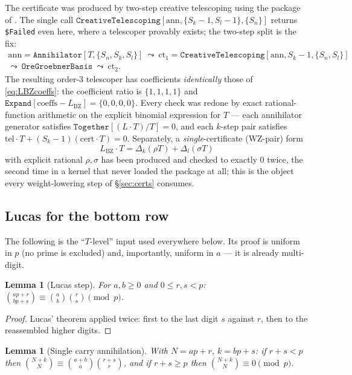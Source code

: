 \documentclass[11pt,reqno]{amsart}
\theoremstyle{plain}
\newtheorem{lemma}[theorem]{Lemma}
\theoremstyle{definition}
\theoremstyle{remark}
\numberwithin{equation}{section}
\newcommand{\LBZ}{L_{\mathrm{BZ}}}
\begin{document}
The certificate was produced by two-step creative telescoping \cite{Zei91,WZ92} using the
package of \cite{Ko10}. The single call
$\mathtt{CreativeTelescoping}[\mathrm{ann},\{S_k{-}1,S_l{-}1\},\{S_n\}]$ returns
\texttt{\$Failed} even here, where a telescoper provably exists; the two-step split is the fix:
\[
\begin{gathered}
\mathrm{ann}=\mathtt{Annihilator}[T,\{S_n,S_k,S_l\}]\ \leadsto\
\mathrm{ct}_1=\mathtt{CreativeTelescoping}[\mathrm{ann},S_k-1,\{S_n,S_l\}]\\
\leadsto\ \mathtt{OreGroebnerBasis}\ \leadsto\ \mathrm{ct}_2 .
\end{gathered}
\]
The resulting order-$3$ telescoper has coefficients \emph{identically} those of
\eqref{eq:LBZcoeffs}: the coefficient ratio is $\{1,1,1,1\}$ and
$\mathtt{Expand}[\text{coeffs}-\LBZ]=\{0,0,0,0\}$. Every check was redone by exact
rational-function arithmetic on the explicit binomial expression for $T$ --- each annihilator
generator satisfies $\mathtt{Together}[(L\cdot T)/T]=0$, and each $k$-step pair satisfies
$\mathrm{tel}\cdot T+(S_k-1)(\mathrm{cert}\cdot T)=0$. Separately, a \emph{single}-certificate
(WZ-pair) form
\[
\LBZ\cdot T=\Delta_k(\rho T)+\Delta_l(\sigma T)
\]
with explicit rational $\rho,\sigma$ has been produced and checked to exactly $0$ twice, the
second time in a kernel that never loaded the package at all; this is the object every
weight-lowering step of \S\ref{sec:certs} consumes.

\subsection{Lucas for the bottom row}

The following is the ``$T$-level'' input used everywhere below. Its proof is uniform in $p$
(no prime is excluded) and, importantly, uniform in $a$ --- it is already multi-digit.

\begin{lemma}[Lucas step]\label{lem:L1}
For $a,b\ge0$ and $0\le r,s<p$: $\binom{ap+r}{bp+s}\equiv\binom{a}{b}\binom{r}{s}\pmod p$.
\end{lemma}

\begin{proof}
Lucas' theorem applied twice: first to the last digit $s$ against $r$, then to the reassembled
higher digits.
\end{proof}

\begin{lemma}[Single carry annihilation]\label{lem:L2}
With $N=ap+r$, $k=bp+s$: if $r+s<p$ then $\binom{N+k}{N}\equiv\binom{a+b}{a}\binom{r+s}{r}$,
and if $r+s\ge p$ then $\binom{N+k}{N}\equiv0\pmod p$.
\end{lemma}
\end{document}
